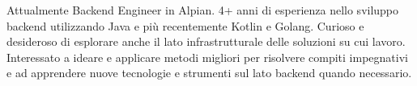

\begin{cvparagraph}
	
	Attualmente Backend Engineer in Alpian. 4+ anni di esperienza nello sviluppo backend utilizzando Java e più recentemente Kotlin e Golang. Curioso e desideroso di esplorare anche il lato infrastrutturale delle soluzioni su cui lavoro. Interessato a ideare e applicare metodi migliori per risolvere compiti impegnativi e ad apprendere nuove tecnologie e strumenti sul lato backend quando necessario.
\end{cvparagraph}